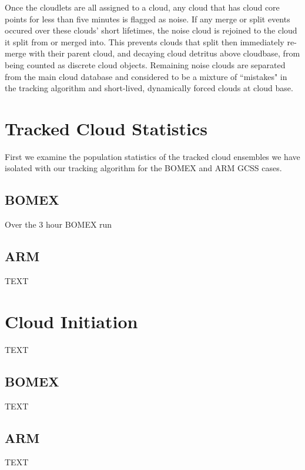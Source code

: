 \documentclass[acp]{copernicus}
\begin{document}
Once the cloudlets are all assigned to a cloud, any cloud that has cloud core points for less than five minutes is flagged as noise.  If any merge or split 
events occured over these clouds' short lifetimes, the noise cloud is rejoined 
to the cloud it split from or merged into.  This prevents clouds that split
then immediately re-merge with their parent cloud, and decaying cloud detritus 
above cloudbase, from being counted as discrete cloud objects.  Remaining 
noise clouds are separated from the main cloud database and considered to be a mixture of ``mistakes" in the tracking algorithm and short-lived, dynamically forced clouds at cloud base.


\section{Tracked Cloud Statistics}

First we examine the population statistics of the tracked cloud ensembles we 
have isolated with our tracking algorithm for the BOMEX and ARM GCSS cases.

\subsection{BOMEX}

Over the 3 hour BOMEX run

\subsection{ARM}

TEXT


\section{Cloud Initiation}
TEXT

\subsection{BOMEX}
TEXT

\subsection{ARM}
TEXT
\end{document}
